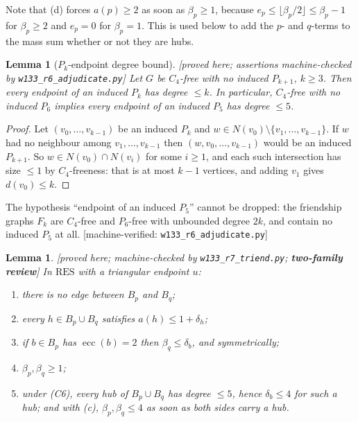 \documentclass[11pt]{article}
\theoremstyle{plain}
\newtheorem{lemma}[theorem]{Lemma}
\theoremstyle{definition}
\theoremstyle{remark}
\numberwithin{equation}{section}
\newcommand{\ecc}{\operatorname{ecc}}
\newcommand{\statusbox}[1]{{\small\sloppy\textsf{[#1]}}}
\newcommand{\PRV}[1]{\statusbox{proved here; assertions machine-checked by \texttt{#1}}}
\newcommand{\REV}[1]{\statusbox{proved here; machine-checked by \texttt{#1};
\textbf{two-family review}}}
\newcommand{\MV}[1]{\statusbox{machine-verified: \texttt{#1}}}
\begin{document}
Note that (d) forces $a(p) \ge 2$ as soon as $\beta_p \ge 1$, because
$e_p \le \lfloor \beta_p/2\rfloor \le \beta_p - 1$ for $\beta_p \ge 2$ and $e_p = 0$ for
$\beta_p = 1$. This is used below to add the $p$- and $q$-terms to the mass sum whether or not
they are hubs.

\begin{lemma}[$P_k$-endpoint degree bound]\label{lem:g22}
\PRV{w133\_r6\_adjudicate.py}
Let $G$ be $C_4$-free with no induced $P_{k+1}$, $k \ge 3$. Then every endpoint of an induced
$P_k$ has degree $\le k$. In particular, $C_4$-free with no induced $P_6$ implies every
endpoint of an induced $P_5$ has degree $\le 5$.
\end{lemma}

\begin{proof}
Let $(v_0,\dots,v_{k-1})$ be an induced $P_k$ and $w \in N(v_0)\setminus\{v_1,\dots,
v_{k-1}\}$. If $w$ had no neighbour among $v_1,\dots,v_{k-1}$ then
$(w,v_0,\dots,v_{k-1})$ would be an induced $P_{k+1}$. So $w \in N(v_0)\cap N(v_i)$ for some
$i \ge 1$, and each such intersection has size $\le 1$ by $C_4$-freeness: that is at most
$k-1$ vertices, and adding $v_1$ gives $d(v_0)\le k$.
\end{proof}

The hypothesis ``endpoint of an induced $P_5$'' cannot be dropped: the friendship graphs
$F_k$ are $C_4$-free and $P_6$-free with unbounded degree $2k$, and contain no induced $P_5$
at all. \MV{w133\_r6\_adjudicate.py}

\begin{lemma}\label{lem:g25}
\REV{w133\_r7\_triend.py}
In $\mathrm{RES}$ with a triangular endpoint $u$:
\begin{enumerate}
\item[(a)] there is no edge between $B_p$ and $B_q$;
\item[(b)] every $h \in B_p \cup B_q$ satisfies $a(h)\le 1 + \delta_h$;
\item[(c)] if $b \in B_p$ has $\ecc(b) = 2$ then $\beta_q \le \delta_b$, and symmetrically;
\item[(d)] $\beta_p, \beta_q \ge 1$;
\item[(e)] under (C6), every hub of $B_p \cup B_q$ has degree $\le 5$, hence $\delta_b \le 4$
for such a hub; and with (c), $\beta_p,\beta_q \le 4$ as soon as both sides carry a hub.
\end{enumerate}
\end{lemma}
\end{document}
